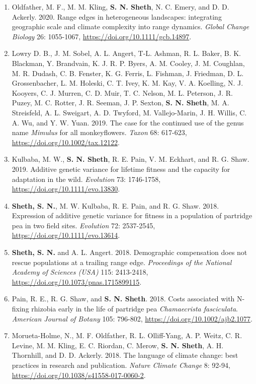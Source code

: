 \documentclass[11pt,english]{article}
\begin{document}
\begin{hangparas}{.5in}{1}
\begin{enumerate}
\item Oldfather, M. F., M. M. Kling, \textbf{S. N. Sheth}, N. C. Emery, and D. D. Ackerly. 2020. Range edges in heterogeneous landscapes: integrating geographic scale and climate complexity into range dynamics. \emph{Global Change Biology} 26: 1055-1067, \url{https://doi.org/10.1111/gcb.14897}. 

\item Lowry D. B., J. M. Sobel, A. L. Angert, T-L. Ashman, R. L. Baker, B. K. Blackman, Y. Brandvain, K. J. R. P. Byers, A. M. Cooley, J. M. Coughlan, M. R. Dudash, C. B. Fenster, K. G. Ferris, L. Fishman, J. Friedman, D. L. Grossenbacher, L. M. Holeski, C. T. Ivey, K. M. Kay, V. A. Koelling, N. J. Kooyers, C. J. Murren, C. D. Muir, T. C. Nelson, M. L. Peterson, J. R. Puzey, M. C. Rotter, J. R. Seeman, J. P. Sexton, \textbf{S. N. Sheth}, M. A. Streisfeld, A. L. Sweigart, A. D. Twyford, M. Vallejo-Marin, J. H. Willis, C. A. Wu, and Y. W. Yuan. 2019. The case for the continued use of the genus name \textit{Mimulus} for all monkeyflowers. \emph{Taxon} 68: 617-623, \url{https://doi.org/10.1002/tax.12122}. 

\item Kulbaba, M. W., \textbf{S. N. Sheth}, R. E. Pain, V. M. Eckhart, and R. G. Shaw. 2019. Additive genetic variance for lifetime fitness and the capacity for adaptation in the wild. \emph{Evolution} 73: 1746-1758, \url{https://doi.org/10.1111/evo.13830}. 

\item \textbf{Sheth, S. N.}, M. W. Kulbaba, R. E. Pain, and R. G. Shaw. 2018. Expression of additive genetic variance for fitness in a population of partridge pea in two field sites. \emph{Evolution} 72: 2537-2545, \url{https://doi.org/10.1111/evo.13614}. 

\item \textbf{Sheth, S. N.} and A. L. Angert. 2018. Demographic compensation does not rescue populations at a trailing range edge. \emph{Proceedings of the National Academy of Sciences (USA)} 115: 2413-2418, \url{https://doi.org/10.1073/pnas.1715899115}. 

\item Pain, R. E., R. G. Shaw, and \textbf{S. N. Sheth}. 2018. Costs associated with N-fixing rhizobia early in the life of partridge pea \textit{Chamaecrista fasciculata}. \emph{American Journal of Botany} 105: 796-802, \url{https://doi.org/10.1002/ajb2.1077}. 

\item Morueta-Holme, N., M. F. Oldfather, R. L. Olliff-Yang, A. P. Weitz, C. R. Levine, M. M. Kling, E. C. Riordan, C. Merow, \textbf{S. N. Sheth}, A. H. Thornhill, and D. D. Ackerly. 2018. The language of climate change: best practices in research and publication. \emph{Nature Climate Change} 8: 92-94, \url{https://doi.org/10.1038/s41558-017-0060-2}.


\end{enumerate}
\end{hangparas}
\end{document}
